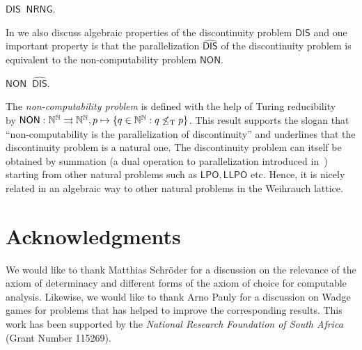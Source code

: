 \documentclass{amsart}
\def\IN{{\Bbb{N}}}
\def\mto{\rightrightarrows}
\def\LPO{\mathsf{LPO}}
\def\LLPO{\mathsf{LLPO}}
\def\leqT{\mathop{\leq_{\mathrm{T}}}}
\def\equivSW{\mathop{\equiv_{\mathrm{sW}}}}
\def\leqT{\mathop{\leq_{\mathrm{T}}}}
\def\equivSW{\mathop{\equiv_{\mathrm{sW}}}}
\def\NON{\mathsf{NON}}
\def\NRNG{\mathsf{NRNG}}
\def\DIS{\mathsf{DIS}}
\begin{document}
\begin{proposition}
$\DIS\equivSW\NRNG$.
\end{proposition}

In \cite{Bra20b} we also discuss algebraic properties of the discontinuity problem $\DIS$ and one important property is that
the parallelization $\widehat{\DIS}$ of the discontinuity problem is equivalent to the non-computability problem $\NON$.

\begin{theorem}
$\NON\equivSW\widehat{\DIS}$.
\end{theorem}

The {\em non-computability problem} is defined with the help of Turing reducibility $\leqT$ by
$\NON:\IN^\IN\mto\IN^\IN,p\mapsto\{q\in\IN^\IN:q\not\leq_\mathrm{T} p\}$.
This result supports the slogan that ``non-computability is the parallelization of discontinuity'' and underlines
that the discontinuity problem is a natural one. 
The discontinuity problem can itself be obtained by summation (a dual operation to parallelization introduced in~\cite{Bra20b})
starting from other natural problems such as $\LPO,\LLPO$ etc. Hence, it is nicely related in an algebraic
way to other natural problems in the Weihrauch lattice.






\section*{Acknowledgments}

We would like to thank Matthias Schr\"oder for a discussion on the relevance of the axiom of determinacy and different forms of the axiom of choice for computable analysis.
Likewise, we would like to thank Arno Pauly for a discussion on Wadge games for problems
that has helped to improve the corresponding results.
This work has been supported by the {\em National Research Foundation of South Africa} (Grant Number 115269).
\end{document}
